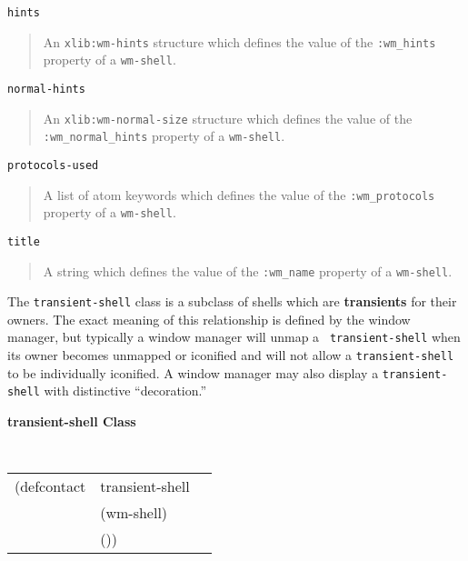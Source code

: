 \begin{flushright} \parbox[t]{6.125in}{
{\tt hints}
\begin{quote}
An {\tt xlib:wm-hints} structure which defines the value of the
{\tt :wm\_hints} property of a {\tt wm-shell}. 
\end{quote}

}\end{flushright}

\begin{flushright} \parbox[t]{6.125in}{
{\tt normal-hints}
\begin{quote}
An {\tt xlib:wm-normal-size} structure which defines the value of the
{\tt :wm\_normal\_hints} property of a {\tt wm-shell}. 
\end{quote}
}\end{flushright}

\begin{flushright} \parbox[t]{6.125in}{
{\tt protocols-used}
\begin{quote}
A list of atom keywords which defines the value of the
{\tt :wm\_protocols} property of a {\tt wm-shell}.
\end{quote}

}\end{flushright}

\begin{flushright} \parbox[t]{6.125in}{
{\tt title   }
\begin{quote}
A string which defines the value of the
{\tt :wm\_name} property of a {\tt wm-shell}. 
\end{quote}

}\end{flushright}




The {\tt transient-shell} class is
a subclass of shells which are {\bf transients}
for
their owners. The exact meaning of this relationship is defined by the
window manager, but typically a window manager will unmap a {\tt
transient-shell} when its owner becomes unmapped or iconified and will
not allow a {\tt transient-shell} to be individually iconified.  A window
manager may also display a {\tt transient-shell} with distinctive
``decoration.''

{\samepage 
{\large {\bf transient-shell \hfill Class}} 
\begin{flushright} \parbox[t]{6.125in}{
\tt
\begin{tabular}{lll}
\raggedright
(defcontact &transient-shell \\
& (wm-shell)\\
&  ())
\end{tabular}
\rm

}\end{flushright}}
 

